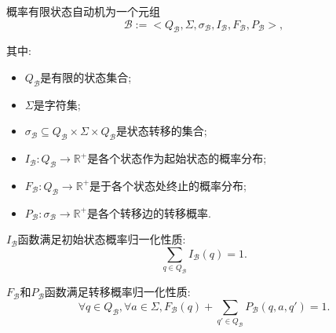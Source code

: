             \begin{definition}
                \label{def.pfsa}
                概率有限状态自动机为一个元组
                \begin{equation}
                    \mathcal{B} := <Q_{\mathcal{B}}, \Sigma, \sigma_{\mathcal{B}}, I_{\mathcal{B}}, F_{\mathcal{B}}, P_{\mathcal{B}}>,
                \end{equation}
                
                其中:
                \begin{itemize}
                    \item $Q_{\mathcal{B}}$是有限的状态集合;
                    
                    \item $\Sigma$是字符集;
                    
                    \item $\sigma_{\mathcal{B}} \subseteq Q_{\mathcal{B}} \times \Sigma \times Q_{\mathcal{B}}$是状态转移的集合;
                    
                    \item $I_{\mathcal{B}} : Q_{\mathcal{B}} \to \mathbb{R}^{+}$是各个状态作为起始状态的概率分布;
                    
                    \item $F_{\mathcal{B}}: Q_{\mathcal{B}} \to \mathbb{R}^{+}$是于各个状态处终止的概率分布;
                    
                    \item $P_{\mathcal{B}} : \sigma_{\mathcal{B}} \to \mathbb{R}^{+}$是各个转移边的转移概率.
                \end{itemize}
                
                $I_{\mathcal{B}}$函数满足初始状态概率归一化性质:
                \begin{equation}
                    \sum_{q \in Q_{\mathcal{B}}} I_{\mathcal{B}}(q) = 1.
                \end{equation}
                
                $F_{\mathcal{B}}$和$P_{\mathcal{B}}$函数满足转移概率归一化性质:
                \begin{equation}
                    \forall q \in Q_{\mathcal{B}}, \forall a \in \Sigma, F_{\mathcal{B}}(q) + \sum_{q' \in Q_{\mathcal{B}}} P_{\mathcal{B}}(q,a,q') = 1.
                \end{equation}
            \end{definition}
            
